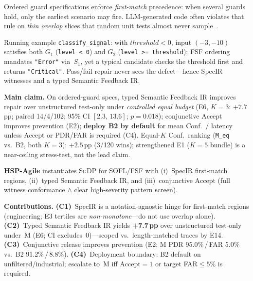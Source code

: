Ordered guard specifications enforce \emph{first-match} precedence: when
several guards hold, only the earliest scenario may fire.
LLM-generated code often violates that rule on \emph{thin overlap} slices that
random unit tests almost never sample~\cite{ammann2016testing,zhu1997specification}.

Running example \texttt{classify\_signal}: with $\mathit{threshold}{<}0$,
input $(-3,-10)$ satisfies both $G_1$ (\texttt{level < 0}) and $G_2$
(\texttt{level >= threshold}); FSF ordering mandates \texttt{"Error"} via~$S_1$,
yet a typical candidate checks the threshold first and returns
\texttt{"Critical"}.
Pass/fail repair never sees the defect---hence SpecIR witnesses and a typed
Semantic Feedback IR.

\textbf{Main claim.}
On ordered-guard specs, typed Semantic Feedback IR improves repair over
unstructured test-only under \emph{controlled equal budget} (E6, $K{=}3$:
${+}7.7$\,pp; paired 14/4/102; 95\% CI $[2.3,\,13.6]$; $p{=}0.018$);
conjunctive $\mathrm{Accept}$ improves prevention (E2);
\textbf{deploy B2 by default} for mean Conf.\ / latency unless Accept or
PDR/FAR is required (C4).
Equal-$K$ Conf.\ ranking (\texttt{M\_eq} vs.\ B2, both $K{=}3$): ${+}2.5$\,pp
(3/120 wins); strengthened E1 ($K{=}5$ bundle) is a near-ceiling stress-test,
not the lead claim.

\textbf{HSP-Agile} instantiates \textsc{SgDP} for SOFL/FSF with
(i)~SpecIR first-match regions,
(ii)~typed Semantic Feedback IR, and
(iii)~conjunctive $\mathrm{Accept}$ (full witness conformance $\wedge$ clear
high-severity pattern screen).

\textbf{Contributions.}
\textbf{(C1)}~SpecIR is a notation-agnostic hinge for first-match regions
(engineering; E3 tertiles are \emph{non-monotone}---do not use overlap alone).
\textbf{(C2)}~Typed Semantic Feedback IR yields \textbf{+7.7\,pp} over
unstructured test-only under~M (E6; CI excludes~0)---scoped vs.\ length-matched
traces by E14.
\textbf{(C3)}~Conjunctive release improves prevention (E2: M PDR
95.0\%\,/\,FAR 5.0\% vs.\ B2 91.2\%\,/\,8.8\%).
\textbf{(C4)}~Deployment boundary: B2 default on unfiltered/industrial;
escalate to~M iff $\mathrm{Accept}{=}1$ or target FAR${\le}5\%$ is required.
